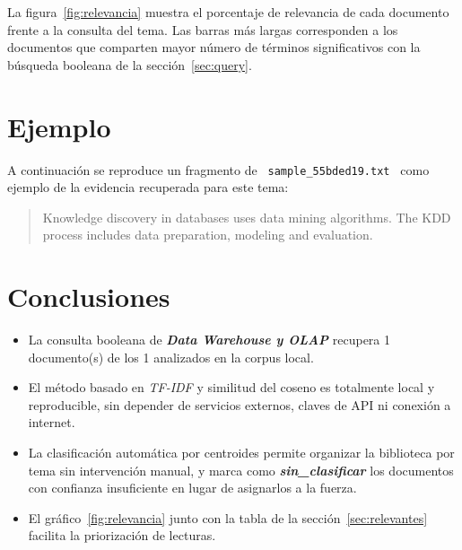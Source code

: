 \documentclass[11pt,a4paper]{article}
\newcommand{\tema}[1]{\textbf{\textit{#1}}}
\newcommand{\nombrearchivo}[1]{\texttt{#1}}
\begin{document}
La figura~\ref{fig:relevancia} muestra el porcentaje de relevancia de cada
documento frente a la consulta del tema. Las barras más largas corresponden a
los documentos que comparten mayor número de términos significativos con la
búsqueda booleana de la sección~\ref{sec:query}.


\section{Ejemplo}
\label{sec:ejemplo}

A continuación se reproduce un fragmento de
\nombrearchivo{ sample\_55bded19.txt } como ejemplo de la evidencia
recuperada para este tema:

\begin{quote}
\small
Knowledge discovery in databases uses data mining algorithms. The KDD process includes data preparation, modeling and evaluation.
\end{quote}


\section{Conclusiones}
\label{sec:conclusiones}

\begin{itemize}
\setlength{\itemsep}{4pt}
  \item La consulta booleana de \tema{ Data Warehouse y OLAP } recupera
        1 documento(s) de los 1
        analizados en la corpus local.
  \item El método basado en \textit{TF-IDF} y similitud del coseno es
        totalmente local y reproducible, sin depender de servicios externos,
        claves de API ni conexión a internet.
  \item La clasificación automática por centroides permite organizar la
        biblioteca por tema sin intervención manual, y marca como
        \tema{sin\_clasificar} los documentos con confianza insuficiente en
        lugar de asignarlos a la fuerza.
  \item El gráfico~\ref{fig:relevancia} junto con la tabla de la
        sección~\ref{sec:relevantes} facilita la priorización de lecturas.
\end{itemize}
\end{document}
